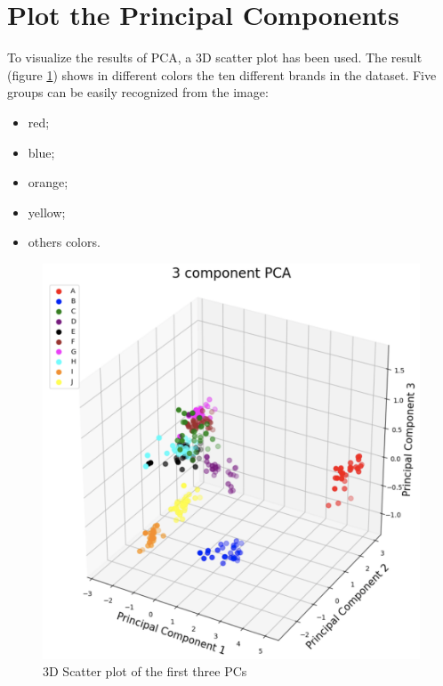 \documentclass[../main.tex]{subfiles}
\begin{document}
\section{Plot the Principal Components}
To visualize the results of PCA, a 3D scatter plot has been used. The result (figure \ref{fig:plot_pca}) shows in different colors the ten different brands in the dataset. Five groups can be easily recognized from the image:
\begin{itemize}
    \item red;
    \item blue;
    \item orange;
    \item yellow;
    \item others colors.
\end{itemize}
\begin{figure}[H]
    \centering
    \includegraphics[width=\columnwidth]{img/plotPCA.png}
    \caption{3D Scatter plot of the first three PCs}
    \label{fig:plot_pca}
\end{figure}
\end{document}
